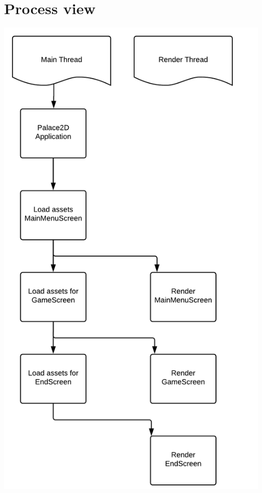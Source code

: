 \documentclass{article}
\begin{document}
\section{Process view}
\begin{center}
    \includegraphics[scale=0.2]{processview.png}
\end{center}
\end{document}
